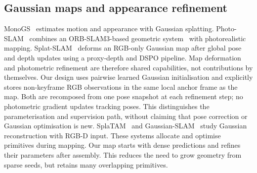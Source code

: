 \subsection{Gaussian maps and appearance refinement}
MonoGS~\cite{matsuki2024monogs} estimates motion and appearance with Gaussian
splatting. Photo-SLAM~\cite{huang2024photoslam} combines an ORB-SLAM3-based
geometric system~\cite{campos2021orbslam3} with photorealistic mapping.
Splat-SLAM~\cite{sandstrom2025splatslam} deforms an RGB-only Gaussian map
after global pose and depth updates using a proxy-depth and DSPO pipeline.
Map deformation and photometric refinement are therefore shared capabilities,
not contributions by themselves. Our design uses pairwise learned Gaussian
initialisation and explicitly stores non-keyframe RGB observations in the
same local anchor frame as the map. Both are recomposed from one pose snapshot
at each refinement step; no photometric gradient updates tracking poses.
This distinguishes the parameterisation and supervision path, without claiming
that pose correction or Gaussian optimisation is new.
SplaTAM~\cite{keetha2024splatam} and Gaussian-SLAM~\cite{yugay2023gaussianslam}
study Gaussian reconstruction with RGB-D input. These systems allocate and
optimise primitives during mapping. Our map starts with dense predictions
and refines their parameters after assembly. This reduces the need to grow
geometry from sparse seeds, but retains many overlapping primitives.
